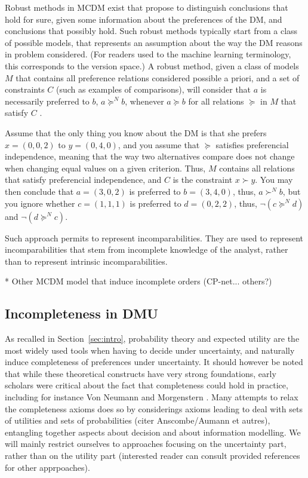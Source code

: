 \documentclass[french, english]{llncs}
\begin{document}
	Robust methods in MCDM exist that propose to distinguish conclusions that hold for sure, given some information about the preferences of the DM, and conclusions that possibly hold. Such robust methods typically start from a class of possible models, that represents an assumption about the way the \ac{DM} reasons in problem considered. (For readers used to the machine learning terminology, this corresponds to the version space.) A robust method, given a class of models $M$ that contains all preference relations considered possible a priori, and a set of constraints $C$ (such as examples of comparisons), will consider that $a$ is necessarily preferred to $b$, $a \succeq^N b$, whenever $a \succeq b$ for all relations $\succeq$ in $M$ that satisfy $C$ \citep{greco_ordinal_2008}.
	\begin{example} Assume that the only thing you know about the \ac{DM} is that she prefers $x = (0, 0, 2)$ to $y = (0, 4, 0)$, and you assume that $\succeq$ satisfies preferencial independence, meaning that the way two alternatives compare does not change when changing equal values on a given criterion. Thus, $M$ contains all relations that satisfy preferencial independence, and $C$ is the constraint $x \succ y$. You may then conclude that $a = (3, 0, 2)$ is preferred to $b = (3, 4, 0)$, thus, $a \succ^N b$, but you ignore whether $c = (1, 1, 1)$ is preferred to $d = (0, 2, 2)$, thus, $¬(c \succeq^N d)$ and $¬(d \succeq^N c)$.
	\end{example} 
	Such approach permits to represent incomparabilities. They are used to represent incomparabilities that stem from incomplete knowledge of the analyst, rather than to represent intrinsic incomparabilities.
	
	* Other MCDM model that induce incomplete orders (CP-net... others?)
	
	\subsection{Incompleteness in DMU}
	
	As recalled in Section~\ref{sec:intro}, probability theory and expected utility are the most widely used tools when having to decide under uncertainty, and naturally induce completeness of preferences under uncertainty. It should however be noted that while these theoretical constructs have very strong foundations, early scholars were critical about the fact that completeness could hold in practice, including for instance Von Neumann and Morgenstern \citet[p. 19]{vNM} . Many attempts to relax the completeness axioms does so by considerings axioms leading to deal with sets of utilities and sets of probabilities (citer Anscombe/Aumann et autres), entangling together aspects about decision and about information modelling. We will mainly restrict ourselves to approaches focusing on the uncertainty part, rather than on the utility part (interested reader can consult provided references for other apprpoaches). 
	
\end{document}
